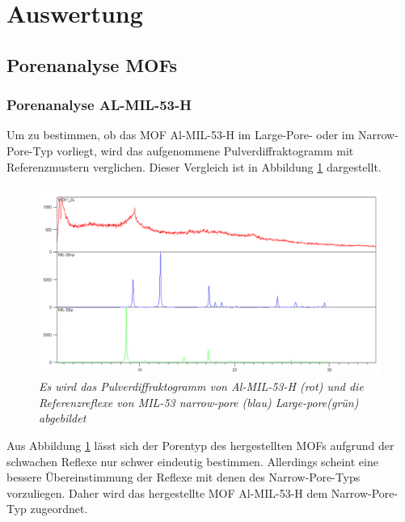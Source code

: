 \documentclass[12pt, a4paper]{article}
\begin{document}
\newpage
\section{Auswertung}
\subsection{Porenanalyse MOFs}
\subsubsection{Porenanalyse AL-MIL-53-H}
Um zu bestimmen, ob das MOF Al-MIL-53-H im Large-Pore- oder im Narrow-Pore-Typ vorliegt, wird das aufgenommene Pulverdiffraktogramm mit Referenzmustern verglichen. 
Dieser Vergleich ist in Abbildung \ref{MOF125ver} dargestellt.
\begin{figure}[!ht]
    \centering
    \includegraphics[scale=0.5]{MOF125ver.png}
    \caption{\textit{Es wird das Pulverdiffraktogramm von Al-MIL-53-H (rot) und die Referenzreflexe von MIL-53 narrow-pore (blau) Large-pore(grün) abgebildet}}
    \label{MOF125ver}
\end{figure}

\noindent
Aus Abbildung \ref{MOF125ver} lässt sich der Porentyp des hergestellten MOFs aufgrund der schwachen Reflexe nur schwer eindeutig bestimmen. 
Allerdings scheint eine bessere Übereinstimmung der Reflexe mit denen des Narrow-Pore-Typs vorzuliegen. 
Daher wird das hergestellte MOF Al-MIL-53-H dem Narrow-Pore-Typ zugeordnet.
\end{document}
